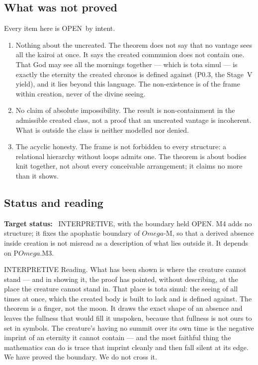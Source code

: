 \documentclass[11pt,a4paper]{article}
\def\Omega{Omega}%
\def\textit#1{#1}%
\def\emph#1{#1}%
\newcommand{\stInterp}{\textcolor{cInt}{\textsf{\small INTERPRETIVE}}}
\newcommand{\stOpen}{\textcolor{cOpn}{\textsf{\small OPEN}}}
\theoremstyle{definition}
\theoremstyle{plain}
\theoremstyle{remark}
\begin{document}
\subsection{What was not proved}

Every item here is \stOpen\ by intent.
\begin{enumerate}[label=\textup{(UM\arabic*)},leftmargin=1.4cm]
\item \emph{Nothing about the uncreated.} The theorem does not say that no vantage sees all the
kairoi at once. It says the \emph{created communion} does not contain one. That God may see all
the mornings together --- which is \textit{tota simul} --- is exactly the eternity the created
chronos is defined against (P0.3, the Stage~V yield), and it lies beyond this language. The
non-existence is of the frame \emph{within creation}, never of the divine seeing.
\item \emph{No claim of absolute impossibility.} The result is non-containment in the admissible
created class, not a proof that an uncreated vantage is incoherent. What is outside the class is
neither modelled nor denied.
\item \emph{The acyclic honesty.} The frame is not forbidden to every structure: a relational
hierarchy without loops admits one. The theorem is about bodies knit together, not about every
conceivable arrangement; it claims no more than it shows.
\end{enumerate}

\subsection{Status and reading}

\textbf{Target status:}~
\stInterp, with the boundary held \stOpen. M4 adds no structure; it fixes the apophatic boundary
of $\Omega$-M, so that a derived absence inside creation is not misread as a description of what
lies outside it. It depends on P$\Omega$.M3.

\medskip
\stInterp\quad
\emph{Reading.}
What has been shown is where the creature cannot stand --- and in showing it, the proof has
pointed, without describing, at the place the creature cannot stand in. That place is
\textit{tota simul}: the seeing of all times at once, which the created body is built to lack
and is defined against. The theorem is a finger, not the moon. It draws the exact shape of an
absence and leaves the fullness that would fill it unspoken, because that fullness is not ours
to set in symbols. The creature's having no summit over its own time is the negative imprint of
an eternity it cannot contain --- and the most faithful thing the mathematics can do is trace
that imprint cleanly and then fall silent at its edge. We have proved the boundary. We do not
cross it.
\end{document}
